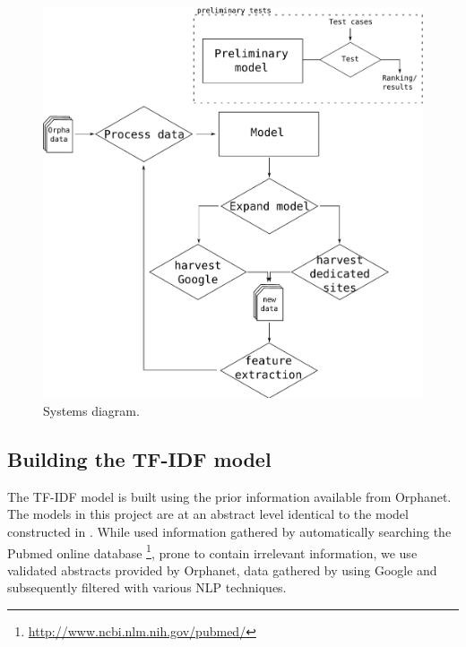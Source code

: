 \documentclass[10pt,letterpaper,final]{article}
\begin{document}
\begin{figure}[htp!]
\begin{center}
\includegraphics[scale=0.4]{images/pipeline}
\caption{Systems diagram.}
\label{fig:flow}
\end{center}
\end{figure}



\subsection{Building the TF-IDF model}
\label{chap:basicmodel}
The TF-IDF model is built using the prior information available
from Orphanet. The models in this project are at an abstract level
identical to the model constructed in \cite{jensenandersen}. While
\cite{jensenandersen} used information gathered by automatically
searching the Pubmed online database
\footnote{\url{http://www.ncbi.nlm.nih.gov/pubmed/}}, prone to contain
irrelevant information, we use validated abstracts provided by Orphanet,
data gathered by using Google and subsequently filtered with various
NLP techniques.
\end{document}
